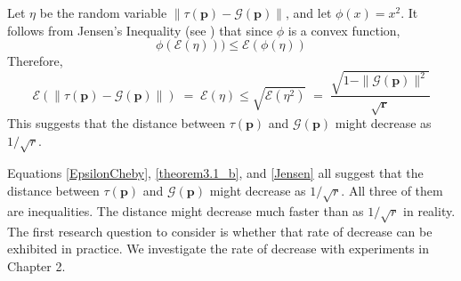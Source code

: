 \begin{itemize}
{Let $\eta$ be the random variable $\| \tau (\bm{p}) - \mathcal{G}(\bm{p}) \|$, and let $\phi (x) = x^2$. 
It follows from Jensen's Inequality (see \cite{JensenInequality}) that 
since $\phi$ is a convex function, 
\[
\phi(\mathcal{E}(\eta))) \leq \mathcal{E}(\phi(\eta)) 
\]
Therefore,
\begin{equation}
\label{Jensen}
\mathcal{E}(\| \tau (\bm{p}) - \mathcal{G}(\bm{p}) \|) \;=\; \mathcal{E}(\eta) \leq \sqrt{\mathcal{E}(\eta^2)} \;=\; \frac{\sqrt{1 - \|\mathcal{G}(\bm{p})\|^2}}{\sqrt{\bm{r}}}
\end{equation}
This suggests that the distance between $\tau (\bm{p})$ and $\mathcal{G}(\bm{p})$ might decrease as $1/\sqrt{r}$. 

Equations \ref{EpsilonCheby}, \ref{theorem3.1_b}, and \ref{Jensen} all suggest that the 
distance between $\tau(\bm{p})$ and $\mathcal{G}(\bm{p})$ might decrease as $1/\sqrt{r}$. 
All three of them are inequalities. The distance might decrease much faster than as $1/\sqrt{r}$ in reality. 
The first research question to consider is whether that rate of decrease can be exhibited 
in practice. We investigate the rate of decrease with experiments in Chapter 2.
}


\end{itemize}
